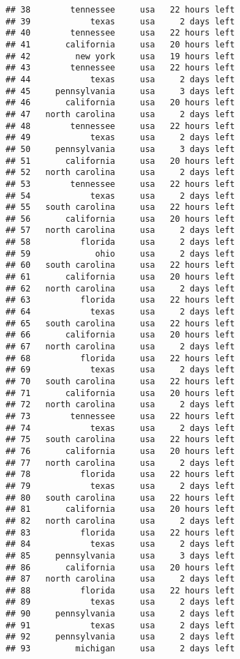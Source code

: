 \documentclass[
]{article}
\begin{document}
\begin{verbatim}
## 38        tennessee     usa   22 hours left
## 39            texas     usa     2 days left
## 40        tennessee     usa   22 hours left
## 41       california     usa   20 hours left
## 42         new york     usa   19 hours left
## 43        tennessee     usa   22 hours left
## 44            texas     usa     2 days left
## 45     pennsylvania     usa     3 days left
## 46       california     usa   20 hours left
## 47   north carolina     usa     2 days left
## 48        tennessee     usa   22 hours left
## 49            texas     usa     2 days left
## 50     pennsylvania     usa     3 days left
## 51       california     usa   20 hours left
## 52   north carolina     usa     2 days left
## 53        tennessee     usa   22 hours left
## 54            texas     usa     2 days left
## 55   south carolina     usa   22 hours left
## 56       california     usa   20 hours left
## 57   north carolina     usa     2 days left
## 58          florida     usa     2 days left
## 59             ohio     usa     2 days left
## 60   south carolina     usa   22 hours left
## 61       california     usa   20 hours left
## 62   north carolina     usa     2 days left
## 63          florida     usa   22 hours left
## 64            texas     usa     2 days left
## 65   south carolina     usa   22 hours left
## 66       california     usa   20 hours left
## 67   north carolina     usa     2 days left
## 68          florida     usa   22 hours left
## 69            texas     usa     2 days left
## 70   south carolina     usa   22 hours left
## 71       california     usa   20 hours left
## 72   north carolina     usa     2 days left
## 73        tennessee     usa   22 hours left
## 74            texas     usa     2 days left
## 75   south carolina     usa   22 hours left
## 76       california     usa   20 hours left
## 77   north carolina     usa     2 days left
## 78          florida     usa   22 hours left
## 79            texas     usa     2 days left
## 80   south carolina     usa   22 hours left
## 81       california     usa   20 hours left
## 82   north carolina     usa     2 days left
## 83          florida     usa   22 hours left
## 84            texas     usa     2 days left
## 85     pennsylvania     usa     3 days left
## 86       california     usa   20 hours left
## 87   north carolina     usa     2 days left
## 88          florida     usa   22 hours left
## 89            texas     usa     2 days left
## 90     pennsylvania     usa     2 days left
## 91            texas     usa     2 days left
## 92     pennsylvania     usa     2 days left
## 93         michigan     usa     2 days left

\end{verbatim}
\end{document}
